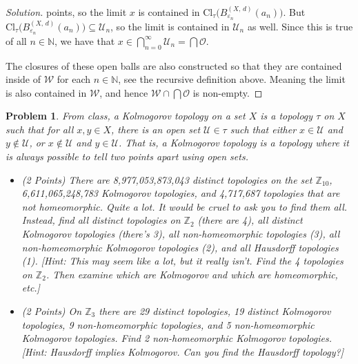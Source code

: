 \documentclass{article}
\theoremstyle{normal}
\newtheorem{problem}{Problem}
\begin{document}
\begin{proof}[Solution]
        points, so the limit $x$ is contained in
        $\textrm{Cl}_{\tau}\big(B_{\varepsilon_{n}}^{(X,\,d)}(a_{n})\big)$. But
        $\textrm{Cl}_{\tau}\big(B_{\varepsilon_{n}}^{(X,\,d)}(a_{n})\big)\subseteq\mathcal{U}_{n}$,
        so the limit is contained in $\mathcal{U}_{n}$ as well. Since this is
        true of all $n\in\mathbb{N}$, we have that
        $x\in\bigcap_{n=0}^{\infty}\mathcal{U}_{n}=\bigcap\mathcal{O}$.
        \par\hfill\par
        The closures of these open balls are also constructed so that they are
        contained inside of $\mathcal{W}$ for each $n\in\mathbb{N}$, see the
        recursive definition above. Meaning the limit is also contained in
        $\mathcal{W}$, and hence
        $\mathcal{W}\cap\bigcap\mathcal{O}$ is non-empty.
    \end{proof}
    \clearpage
    \color{blue}
    \begin{problem}
        From class, a Kolmogorov topology on a set $X$ is a topology
        $\tau$ on $X$ such that for all $x,y\in{X}$, there is an open set
        $\mathcal{U}\in\tau$ such that either $x\in\mathcal{U}$ and
        $y\notin\mathcal{U}$, or $x\notin\mathcal{U}$ and $y\in\mathcal{U}$.
        That is, a Kolmogorov topology is a topology where it is always possible
        to tell two points apart using open sets.
        \begin{itemize}
            \item (2 Points)
                There are 8,977,053,873,043 distinct topologies on the set
                $\mathbb{Z}_{10}$, 6,611,065,248,783 Kolmogorov topologies,
                and 4,717,687 topologies that are not homeomorphic. Quite a lot.
                It would be cruel to ask you to find them all. Instead, find all
                distinct topologies on $\mathbb{Z}_{2}$ (there are 4), all
                distinct Kolmogorov topologies (there's 3), all non-homeomorphic
                topologies (3), all non-homeomorphic Kolmogorov topologies
                (2), and all Hausdorff topologies (1). [Hint: This may seem
                like a lot, but it really isn't. Find the 4 topologies on
                $\mathbb{Z}_{2}$. Then examine which are Kolmogorov and which
                are homeomorphic, etc.]
            \item (2 Points)
                On $\mathbb{Z}_{3}$ there are 29 distinct topologies, 19
                distinct Kolmogorov topologies, 9 non-homeomorphic topologies,
                and 5 non-homeomorphic Kolmogorov topologies. Find 2
                non-homeomorphic Kolmogorov topologies.
                [Hint: Hausdorff implies Kolmogorov. Can you find the
                Hausdorff topology?]
        \end{itemize}
    \end{problem}
\end{document}
